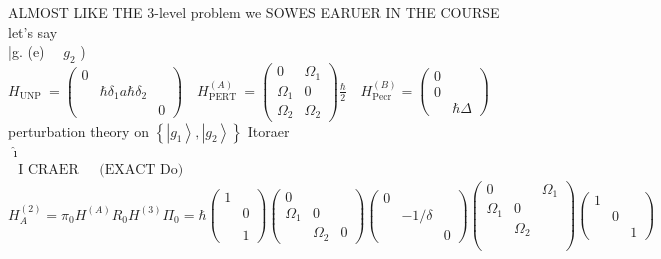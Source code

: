 ALMOST LIKE THE 3-level problem we SOWES EARUER IN THE COURSE\\
let's say\\
|g. (e) $\quad g_{2}$ )\\
$H_{\text {UNP }}=\left(\begin{array}{ccc}0 & & \\ & \hbar \delta_{1} a \hbar \delta_{2} & \\ & & 0\end{array}\right) \quad H_{\text {PERT }}^{(A)}=\left(\begin{array}{cc}0 & \Omega_{1} \\ \Omega_{1} & 0 \\ \Omega_{2} & \Omega_{2}\end{array}\right) \frac{\hbar}{2} \quad H_{\text {Pecr }}^{(B)}=\left(\begin{array}{cc}0 & \\ 0 & \\ & \hbar \Delta\end{array}\right)$\\
perturbation theory on $\left\{\left|g_{1}\right\rangle,\left|g_{2}\right\rangle\right\}$ Itoraer\\
$\begin{array}{ll}\hat{\imath} & \\ \text { I CRAER } & \text { (EXACT Do) }\end{array}$\\
$H_{A}^{(2)}=\pi_{0} H^{(A)} R_{0} H^{(3)} \Pi_{0}=\hbar\left(\begin{array}{cc}1 & \\ & 0 \\ & \\ & 1\end{array}\right)\left(\begin{array}{ccc}0 & & \\ \Omega_{1} & 0 & \\ & \Omega_{2} & 0\end{array}\right)\left(\begin{array}{ccc}0 & & \\ & -1 / \delta & \\ & & 0\end{array}\right)\left(\begin{array}{ccc}0 & & \Omega_{1} \\ \Omega_{1} & 0 & \\ & \Omega_{2} & \\ & & \\ & & \end{array}\right)\left(\begin{array}{lll}1 & & \\ & 0 & \\ & & 1\end{array}\right)$\\
